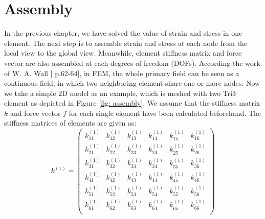 \section{Assembly}
In the previous chapter, we have solved the value of strain and stress in one element. The next step is to assemble strain and stress at each node from the local view to the global view. Meanwhile, element stiffness matrix and force vector are also assembled at each degrees of freedom (DOFs). According the work of W. A. Wall [\cite{FiniteElement} p.62-64], in FEM, the whole primary field can be seen as a continuous field, in which two neighboring element share one or more nodes. Now we take a simple 2D model as an example, which is meshed with two Tri3 element as depicted in Figure \ref{fig: assembly}. We assume that the stiffness matrix $k$ and force vector $f$ for each single element have been calculated beforehand. The stiffness matrices of elements are given as:
\begin{equation} \label{eq: k_1}
k^{\left(1\right)} = \begin{pmatrix}
k_{11}^{\left(1\right)} & k_{12}^{\left(1\right)} &  k_{13}^{\left(1\right)} &  k_{14}^{\left(1\right)} & k_{15}^{\left(1\right)}  & k_{16}^{\left(1\right)}   \\[0.3em]
k_{21}^{\left(1\right)} & k_{22}^{\left(1\right)} &  k_{23}^{\left(1\right)} &  k_{24}^{\left(1\right)} & k_{25}^{\left(1\right)}  & k_{26}^{\left(1\right)}   \\[0.3em]
k_{31}^{\left(1\right)} & k_{32}^{\left(1\right)} &  k_{33}^{\left(1\right)} &  k_{34}^{\left(1\right)} & k_{35}^{\left(1\right)}  & k_{36}^{\left(1\right)}   \\[0.3em]
k_{41}^{\left(1\right)} & k_{42}^{\left(1\right)} &  k_{43}^{\left(1\right)} &  k_{44}^{\left(1\right)} & k_{45}^{\left(1\right)}  & k_{46}^{\left(1\right)}   \\[0.3em]
k_{51}^{\left(1\right)} & k_{52}^{\left(1\right)} &  k_{53}^{\left(1\right)} &  k_{54}^{\left(1\right)} & k_{55}^{\left(1\right)}  & k_{56}^{\left(1\right)}   \\[0.3em]
k_{61}^{\left(1\right)} & k_{62}^{\left(1\right)} &  k_{63}^{\left(1\right)} &  k_{64}^{\left(1\right)} & k_{65}^{\left(1\right)}  & k_{66}^{\left(1\right)}   \\[0.3em]
\end{pmatrix} 
\end{equation}	

